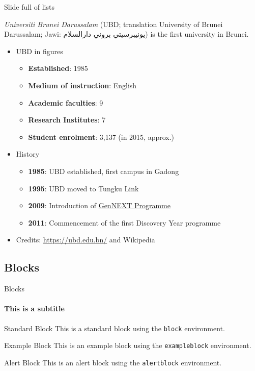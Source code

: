 \documentclass[]{beamer}
\begin{document}
\begin{frame}{Slide full of lists}

\textit{Universiti Brunei Darussalam} (UBD; translation University of Brunei Darussalam; Jawi: \textarabic{يونيبرسيتي بروني دارالسلام}) is the first university in Brunei.

	\begin{itemize}
		\item UBD in figures
			\begin{itemize}
				\item \textbf{Established}: 1985
				\item \textbf{Medium of instruction}: English
				\item \textbf{Academic faculties}: 9
				\item \textbf{Research Institutes}: 7
				\item \textbf{Student enrolment}: 3,137 (in 2015, approx.)
			\end{itemize}
		\item History
			\begin{itemize}
				\item \textbf{1985}: UBD established, first campus in Gadong
				\item \textbf{1995}: UBD moved to Tungku Link
				\item \textbf{2009}: Introduction of \href{https://ubd.edu.bn/admission/undergraduate/gennext-degree-programme/}{GenNEXT Programme}
				\item \textbf{2011}: Commencement of the first Discovery Year programme			
			\end{itemize}
		\item Credits: \url{https://ubd.edu.bn/} and Wikipedia
	\end{itemize}
\end{frame}

\subsection{Blocks}

\begin{frame}{Blocks}
	\framesubtitle{This is a subtitle}
	\begin{block}{Standard Block}
		This is a standard block using the \texttt{block} environment.
	\end{block}
	
	\begin{exampleblock}{Example Block}
		This is an example block using the \texttt{exampleblock} environment.
	\end{exampleblock}
	
	\begin{alertblock}{Alert Block}
		This is an alert block using the \texttt{alertblock} environment.
	\end{alertblock}
\end{frame}
\end{document}
